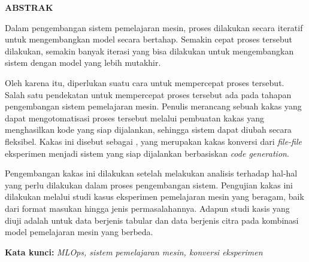 \clearpage
{}
\begin{center}
  \textbf{\large \MakeUppercase{Abstrak}}\\[3em]
\end{center}

Dalam pengembangan sistem pemelajaran mesin, proses dilakukan secara iteratif untuk mengembangkan model secara bertahap.
Semakin cepat proses tersebut dilakukan, semakin banyak iterasi yang bisa dilakukan untuk mengembangkan sistem dengan model yang lebih mutakhir.

Oleh karena itu, diperlukan suatu cara untuk mempercepat proses tersebut.
Salah satu pendekatan untuk mempercepat proses tersebut ada pada tahapan pengembangan sistem pemelajaran mesin.
Penulis merancang sebuah kakas yang dapat mengotomatisasi proses tersebut melalui pembuatan kakas yang menghasilkan kode yang siap dijalankan, sehingga sistem dapat diubah secara fleksibel.
Kakas ini disebut sebagai , yang merupakan kakas konversi dari \textit{file-file} eksperimen menjadi sistem yang siap dijalankan berbasiskan \textit{code generation}.

Pengembangan kakas ini dilakukan setelah melakukan analisis terhadap hal-hal yang perlu dilakukan dalam proses pengembangan sistem.
Pengujian kakas ini dilakukan melalui studi kasus eksperimen pemelajaran mesin yang beragam, baik dari format masukan hingga jenis permasalahannya.
Adapun studi kasis yang diuji adalah untuk data berjenis tabular dan data berjenis citra pada kombinasi model pemelajaran mesin yang berbeda.

\noindent \textbf{Kata kunci:}\newline
\emph{MLOps, sistem pemelajaran mesin, konversi eksperimen}
